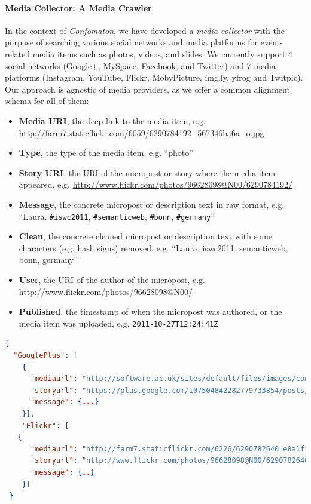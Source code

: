 \paragraph{Media Collector: A Media Crawler}                                                \label{sec:media-collector}
In the context of \emph{Confomaton}, we have developed a \emph{media collector} with the purpose of searching various social networks and media platforms for event-related media items such as photos, videos, and slides. We currently support 4 social networks (Google+, MySpace, Facebook, and Twitter) and 7 media platforms (Instagram, YouTube, Flickr, MobyPicture, img.ly, yfrog and Twitpic). Our approach is agnostic of media providers, as we offer a common alignment schema for all of them:
\begin{itemize}
  \item	\textbf{Media URI}, the deep link to the media item, e.g. \url{http://farm7.staticflickr.com/6059/6290784192_567346ba6a_o.jpg}
  \item \textbf{Type}, the type of the media item, e.g.  ``photo''
  \item \textbf{Story URI}, the URI of the micropost or story where the media item appeared, e.g. \url{http://www.flickr.com/photos/96628098@N00/6290784192/}
  \item \textbf{Message}, the concrete micropost or description text in raw format, e.g.  ``Laura. \texttt{\#iswc2011}, \texttt{\#semanticweb}, \texttt{\#bonn}, \texttt{\#germany}''
  \item \textbf{Clean}, the concrete cleaned micropost or description text with some characters (e.g. hash signs) removed, e.g. ``Laura. iswc2011, semanticweb, bonn, germany''
  \item \textbf{User}, the URI of the author of the micropost, e.g. \url{http://www.flickr.com/photos/96628098@N00/}
  \item \textbf{Published}, the timestamp of when the micropost was authored, or the media item was uploaded, e.g. \texttt{2011-10-27T12:24:41Z}
\end{itemize}

\begin{lstlisting}[caption={Sample output of the media collector showing Google+ and Flickr results using \#iswc2011 as the query term.}, language=json, label={lst:media}]
{
  "GooglePlus": [
    {
	  "mediaurl": "http://software.ac.uk/sites/default/files/images/content/Bonn.jpg",
	  "storyurl": "https://plus.google.com/107504842282779733854/posts/6ucw1Udb5NT",
	  "message": {...}
    }],
    "Flickr": [
   {
      "mediaurl": "http://farm7.staticflickr.com/6226/6290782640_e8a1ffdcc2_o.jpg",
      "storyurl": "http://www.flickr.com/photos/96628098@N00/6290782640/",
      "message": {..}
    }]
 }
\end{lstlisting}

